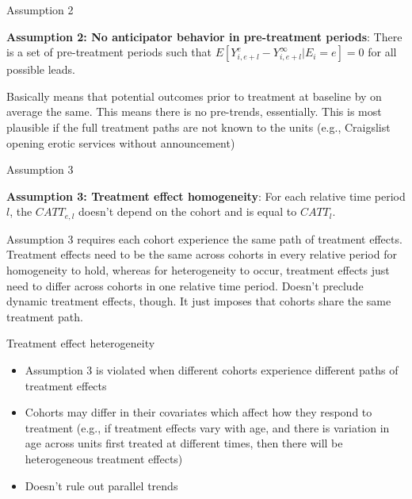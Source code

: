 \documentclass{beamer}
\begin{document}
\begin{frame}{Assumption 2}

\textbf{Assumption 2: No anticipator behavior in pre-treatment periods}: There is a set of pre-treatment periods such that $E[Y_{i,e+l}^e - Y_{i,e+l}^{\infty} | E_i = e]=0$ for all possible leads.

\bigskip

Basically means that potential outcomes prior to treatment at baseline by on average the same.  This means there is no pre-trends, essentially.  This is most plausible if the full treatment paths are not known to the units (e.g., Craigslist opening erotic services without announcement)

\end{frame}


\begin{frame}{Assumption 3}

\textbf{Assumption 3: Treatment effect homogeneity}: For each relative time period $l$, the $CATT_{e,l}$ doesn't depend on the cohort and is equal to $CATT_l$. 

\bigskip

Assumption 3 requires each cohort experience the same path of treatment effects. Treatment effects need to be the same across cohorts in every relative period for homogeneity to hold, whereas for heterogeneity to occur, treatment effects just need to differ across cohorts in one relative time period.  Doesn't preclude dynamic treatment effects, though.  It just imposes that cohorts share the same treatment path.

\end{frame}

\begin{frame}{Treatment effect heterogeneity}

\begin{itemize}
\item Assumption 3 is violated when different cohorts experience different paths of treatment effects
\item Cohorts may differ in their covariates which affect how they respond to treatment (e.g., if treatment effects vary with age, and there is variation in age across units first treated at different times, then there will be heterogeneous treatment effects)
\item Doesn't rule out parallel trends
\end{itemize}

\end{frame}
\end{document}
